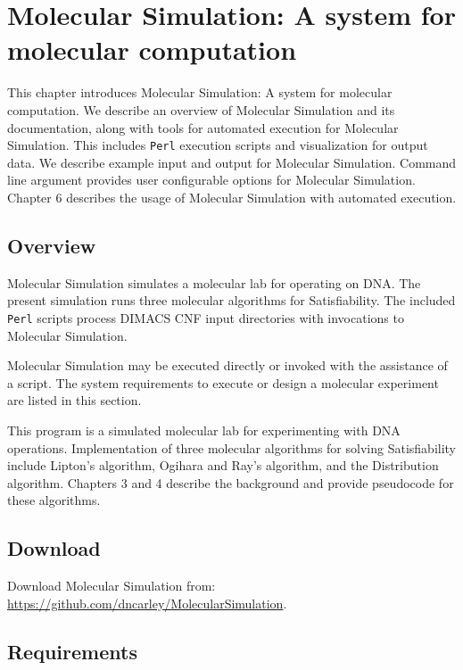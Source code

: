 \chapter{Molecular Simulation: A system for molecular computation}


This chapter introduces Molecular Simulation: A system for molecular computation.  We describe an overview of Molecular Simulation and its documentation, along with tools for automated execution for Molecular Simulation.  This includes \texttt{Perl} execution scripts and visualization for output data.  We describe example input and output for Molecular Simulation.  Command line argument provides user configurable options for Molecular Simulation.  Chapter 6 describes the usage of Molecular Simulation with automated execution.
	
	\section{Overview}
	

Molecular Simulation simulates a molecular lab for operating on DNA.  The present simulation runs three molecular algorithms for {\sc Satisfiability}.  The included \texttt{Perl} scripts process DIMACS CNF input directories with invocations to Molecular Simulation.

Molecular Simulation may be executed directly or invoked with the assistance of a script.  The system requirements to execute or design a molecular experiment are listed in this section.  
		
This program is a simulated molecular lab for experimenting with DNA operations. Implementation of three molecular algorithms for solving {\sc Satisfiability} include Lipton's algorithm, Ogihara and Ray's algorithm, and the Distribution algorithm.  Chapters 3 and 4 describe the background and provide pseudocode for these algorithms.		

	\section{Download}
	\noindent Download Molecular Simulation from: \url{https://github.com/dncarley/MolecularSimulation}. 
	
 	\section{Requirements}
 	
